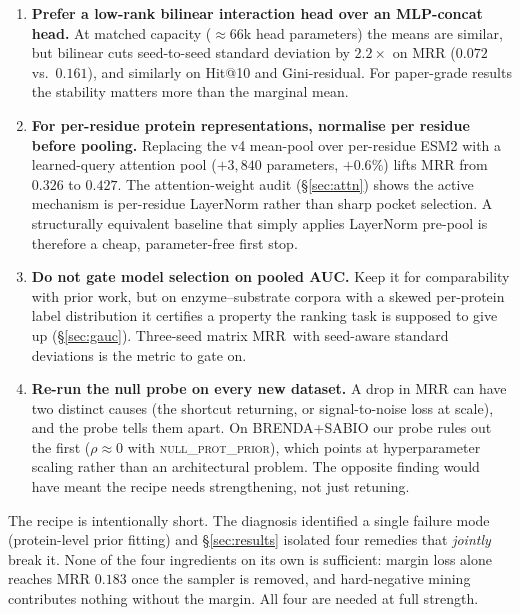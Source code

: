 \documentclass[11pt,a4paper]{article}
\newcommand{\nullprior}{\textsc{null\_prot\_prior}\xspace}
\newcommand{\matmrr}{matrix MRR}
\begin{document}
\begin{enumerate}[leftmargin=*,itemsep=2pt,topsep=2pt]
        informative negatives (it should rise into $0.95+$ over
        training).
  \item \textbf{Prefer a low-rank bilinear interaction head over an
        MLP-concat head.} At matched capacity ($\approx\!66$k head
        parameters) the means are similar, but bilinear cuts
        seed-to-seed standard deviation by $2.2\times$ on MRR
        ($0.072$ vs.\ $0.161$), and similarly on Hit@10 and
        Gini-residual. For paper-grade results the stability matters
        more than the marginal mean.
  \item \textbf{For per-residue protein representations, normalise per
        residue before pooling.} Replacing the v4 mean-pool over
        per-residue ESM2 with a learned-query attention pool
        ($+3{,}840$ parameters, $+0.6\%$) lifts MRR from $0.326$ to
        $0.427$. The attention-weight audit (\S\ref{sec:attn}) shows
        the active mechanism is per-residue LayerNorm rather than
        sharp pocket selection. A structurally equivalent baseline
        that simply applies LayerNorm pre-pool is therefore a cheap,
        parameter-free first stop.
  \item \textbf{Do not gate model selection on pooled AUC.} Keep it
        for comparability with prior work, but on enzyme--substrate
        corpora with a skewed per-protein label distribution it
        certifies a property the ranking task is supposed to give up
        (\S\ref{sec:gauc}). Three-seed \matmrr\ with seed-aware
        standard deviations is the metric to gate on.
  \item \textbf{Re-run the null probe on every new dataset.} A drop
        in MRR can have two distinct causes (the shortcut returning,
        or signal-to-noise loss at scale), and the probe tells them
        apart. On BRENDA+SABIO our probe rules out the first
        ($\rho \approx 0$ with \nullprior), which points at
        hyperparameter scaling rather than an architectural problem.
        The opposite finding would have meant the recipe needs
        strengthening, not just retuning.
\end{enumerate}

The recipe is intentionally short. The diagnosis identified a
single failure mode (protein-level prior fitting) and
\S\ref{sec:results} isolated four remedies that \emph{jointly} break
it. None of the four ingredients on its own is sufficient: margin loss
alone reaches MRR $0.183$ once the sampler is removed, and
hard-negative mining contributes nothing without the margin. All four
are needed at full strength.
\end{document}
